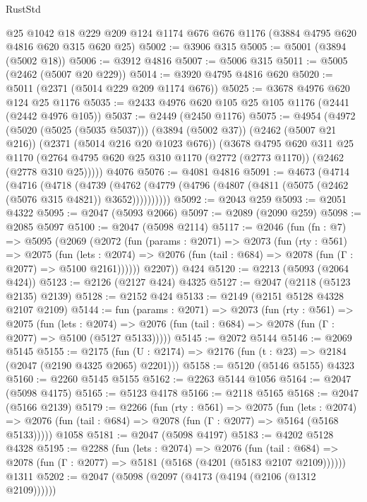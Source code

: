 \begin{lexlean}{RustStd}
\begin{coremodule}
    @25
    @1042
    @18
    @229
    @209
    @124
    @1174
    @676
    @676
    @1176
    (@3884 @4795 @620 @4816 @620 @315 @620 @25)
@5002 := @3906 @315
@5005 := @5001 (@3894 (@5002 @18))
@5006 := @3912 @4816
@5007 := @5006 @315
@5011 := @5005 (@2462 (@5007 @20 @229))
@5014 := @3920 @4795 @4816 @620
@5020 := @5011 (@2371 (@5014 @229 @209 @1174 @676))
@5025 := @3678 @4976 @620 @124 @25 @1176
@5035 := @2433 @4976 @620 @105 @25 @105 @1176 (@2441 (@2442 @4976 @105))
@5037 := @2449 (@2450 @1176)
@5075 := @4954
    (@4972
      (@5020 (@5025 (@5035 @5037)))
      (@3894 (@5002 @37))
      (@2462 (@5007 @21 @216))
      (@2371 (@5014 @216 @20 @1023 @676))
      (@3678
        @4795
        @620
        @311
        @25
        @1170
        (@2764 @4795 @620 @25 @310 @1170 (@2772 (@2773 @1170)) (@2462 (@2778 @310 @25)))))
    @4076
@5076 := @4081 @4816
@5091 := @4673
    (@4714
      (@4716
        (@4718
          (@4739
            (@4762 (@4779 (@4796 (@4807 (@4811 (@5075 (@2462 (@5076 @315 @4821)) @3652))))))))))
@5092 := @2043 @259
@5093 := @2051 @4322
@5095 := @2047 (@5093 @2066)
@5097 := @2089 (@2090 @259)
@5098 := @2085 @5097
@5100 := @2047 (@5098 @2114)
@5117 := @2046
    (fun (fn : @7) =>
    @5095
      (@2069
        (@2072
          (fun (params : @2071) =>
          @2073
            (fun (rty : @561) =>
            @2075
              (fun (lets : @2074) =>
              @2076 (fun (tail : @684) => @2078 (fun (Γ : @2077) => @5100 @2161))))))
        @2207))
    @424
@5120 := @2213 (@5093 (@2064 @424))
@5123 := @2126 (@2127 @424) @4325
@5127 := @2047 (@2118 (@5123 @2135) @2139)
@5128 := @2152 @424
@5133 := @2149 (@2151 @5128 @4328 @2107 @2109)
@5144 := fun (params : @2071) =>
  @2073
    (fun (rty : @561) =>
    @2075
      (fun (lets : @2074) =>
      @2076 (fun (tail : @684) => @2078 (fun (Γ : @2077) => @5100 (@5127 @5133)))))
@5145 := @2072 @5144
@5146 := @2069 @5145
@5155 := @2175 (fun (U : @2174) => @2176 (fun (t : @23) => @2184 (@2047 (@2190 @4325 @2065) @2201)))
@5158 := @5120 (@5146 @5155) @4323
@5160 := @2260 @5145 @5155
@5162 := @2263 @5144 @1056
@5164 := @2047 (@5098 @4175)
@5165 := @5123 @4178
@5166 := @2118 @5165
@5168 := @2047 (@5166 @2139)
@5179 := @2266
    (fun (rty : @561) =>
    @2075
      (fun (lets : @2074) =>
      @2076 (fun (tail : @684) => @2078 (fun (Γ : @2077) => @5164 (@5168 @5133)))))
    @1058
@5181 := @2047 (@5098 @4197)
@5183 := @4202 @5128 @4328
@5195 := @2288
    (fun (lets : @2074) =>
    @2076
      (fun (tail : @684) => @2078 (fun (Γ : @2077) => @5181 (@5168 (@4201 (@5183 @2107 @2109))))))
    @1311
@5202 := @2047 (@5098 (@2097 (@4173 (@4194 (@2106 (@1312 @2109))))))

\end{coremodule}
\end{lexlean}
